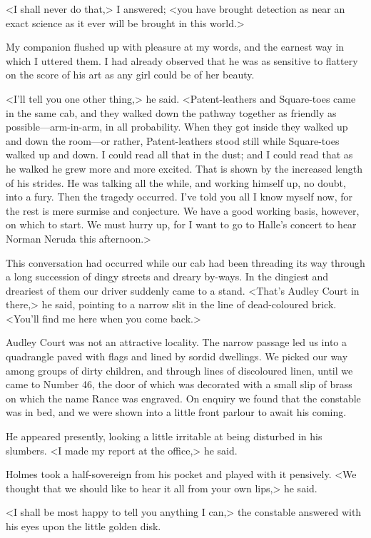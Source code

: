 <I shall never do that,> I answered; <you have brought detection as near an exact science as it ever will be brought in this world.>

My companion flushed up with pleasure at my words, and the earnest way in which I uttered them. I had already observed that he was as sensitive to flattery on the score of his art as any girl could be of her beauty.

<I'll tell you one other thing,> he said. <Patent-leathers and Square-toes came in the same cab, and they walked down the pathway together as friendly as possible—arm-in-arm, in all probability. When they got inside they walked up and down the room—or rather, Patent-leathers stood still while Square-toes walked up and down. I could read all that in the dust; and I could read that as he walked he grew more and more excited. That is shown by the increased length of his strides. He was talking all the while, and working himself up, no doubt, into a fury. Then the tragedy occurred. I've told you all I know myself now, for the rest is mere surmise and conjecture. We have a good working basis, however, on which to start. We must hurry up, for I want to go to Halle's concert to hear Norman Neruda this afternoon.>

This conversation had occurred while our cab had been threading its way through a long succession of dingy streets and dreary by-ways. In the dingiest and dreariest of them our driver suddenly came to a stand. <That's Audley Court in there,> he said, pointing to a narrow slit in the line of dead-coloured brick. <You'll find me here when you come back.>

Audley Court was not an attractive locality. The narrow passage led us into a quadrangle paved with flags and lined by sordid dwellings. We picked our way among groups of dirty children, and through lines of discoloured linen, until we came to Number 46, the door of which was decorated with a small slip of brass on which the name Rance was engraved. On enquiry we found that the constable was in bed, and we were shown into a little front parlour to await his coming.

He appeared presently, looking a little irritable at being disturbed in his slumbers. <I made my report at the office,> he said.

Holmes took a half-sovereign from his pocket and played with it pensively. <We thought that we should like to hear it all from your own lips,> he said.

<I shall be most happy to tell you anything I can,> the constable answered with his eyes upon the little golden disk.

